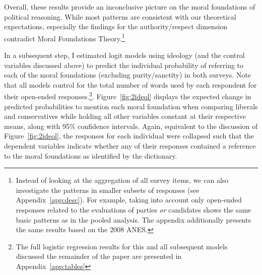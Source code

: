 \documentclass[12pt]{article}
\begin{document}
Overall, these results provide an inconclusive picture on the moral foundations of political reasoning. While most patterns are consistent with our theoretical expectations, especially the findings for the authority/respect dimension contradict Moral Foundations Theory.\footnote{Instead of looking at the aggregation of all survey items, we can also investigate the patterns in smaller subsets of responses (see Appendix~\ref{app:desc}). For example, taking into account only open-ended responses related to the evaluations of parties \textit{or} candidates shows the same basic patterns as in the pooled analysis. The appendix additionally presents the same results based on the 2008 ANES.}

In a subsequent step, I estimated logit models using ideology (and the control variables discussed above) to predict the individual probability of referring to each of the moral foundations (excluding purity/sanctity) in both surveys. Note that all models control for the total number of words used by each respondent for their open-ended responses.\footnote{The full logistic regression results for this and all subsequent models discussed the remainder of the paper are presented in Appendix~\ref{app:tables}}. Figure~\ref{fig:2ideol} displays the expected change in predicted probabilities to mention each moral foundation when comparing liberals and conservatives while holding all other variables constant at their respective means, along with 95\% confidence intervals. Again, equivalent to the discussion of Figure~\ref{fig:2ideol}, the responses for each individual were collapsed such that the dependent variables indicate whether any of their responses contained a reference to the moral foundations as identified by the dictionary. 
\end{document}

